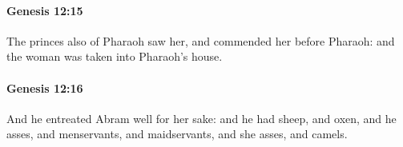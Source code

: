 		\paragraph{Genesis 12:15} %
			\label{GENESIS-12-15}

			The princes also of Pharaoh saw her, and commended her before Pharaoh: and the woman was taken into Pharaoh's house.


		\paragraph{Genesis 12:16} %
			\label{GENESIS-12-16}

			And he entreated Abram well for her sake: and he had sheep, and oxen, and he asses, and menservants, and maidservants, and she asses, and camels.


